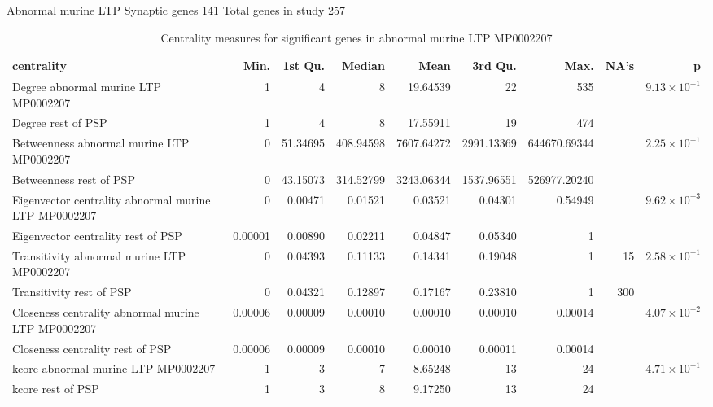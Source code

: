 Abnormal murine LTP
Synaptic genes 141
Total genes in study 257%
\begin{table}[ht]
\centering
\begin{adjustbox}{width=\textwidth}
\begin{tabular}{lrrrrrrrr}
  \hline
centrality & Min. & 1st Qu. & Median & Mean & 3rd Qu. & Max. & NA's & p \\ 
  \hline
Degree abnormal murine LTP MP0002207 & 1   & 4   & 8   & 19.64539 & 22   & 535   &  & $9.13 \times 10^{-1}$ \\ 
  Degree rest of PSP & 1   & 4   & 8   & 17.55911 & 19   & 474   &  &     \\ 
  Betweenness abnormal murine LTP MP0002207 & 0   & 51.34695 & 408.94598 & 7607.64272 & 2991.13369 & 644670.69344 &  & $2.25 \times 10^{-1}$ \\ 
  Betweenness rest of PSP & 0   & 43.15073 & 314.52799 & 3243.06344 & 1537.96551 & 526977.20240 &  &     \\ 
  Eigenvector centrality abnormal murine LTP MP0002207 & 0   & 0.00471 & 0.01521 & 0.03521 & 0.04301 & 0.54949 &  & $9.62 \times 10^{-3}$ \\ 
  Eigenvector centrality rest of PSP & 0.00001 & 0.00890 & 0.02211 & 0.04847 & 0.05340 & 1   &  &     \\ 
  Transitivity abnormal murine LTP MP0002207 & 0   & 0.04393 & 0.11133 & 0.14341 & 0.19048 & 1   & 15 & $2.58 \times 10^{-1}$ \\ 
  Transitivity rest of PSP & 0   & 0.04321 & 0.12897 & 0.17167 & 0.23810 & 1   & 300 &     \\ 
  Closeness centrality abnormal murine LTP MP0002207 & 0.00006 & 0.00009 & 0.00010 & 0.00010 & 0.00010 & 0.00014 &  & $4.07 \times 10^{-2}$ \\ 
  Closeness centrality rest of PSP & 0.00006 & 0.00009 & 0.00010 & 0.00010 & 0.00011 & 0.00014 &  &     \\ 
  kcore abnormal murine LTP MP0002207 & 1   & 3   & 7   & 8.65248 & 13   & 24   &  & $4.71 \times 10^{-1}$ \\ 
  kcore rest of PSP & 1   & 3   & 8   & 9.17250 & 13   & 24   &  &     \\ 
   \hline
\end{tabular}
\end{adjustbox}
\caption{Centrality measures for significant genes in abnormal murine LTP MP0002207} 
\label{tab:Centrality measures for significant genes in abnormal murine LTP MP0002207}
\end{table}

